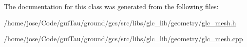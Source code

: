 The documentation for this class was generated from the following files\-:\begin{DoxyCompactItemize}
\item 
/home/jose/\-Code/gui\-Tau/ground/gcs/src/libs/glc\-\_\-lib/geometry/\hyperlink{glc__mesh_8h}{glc\-\_\-mesh.\-h}\item 
/home/jose/\-Code/gui\-Tau/ground/gcs/src/libs/glc\-\_\-lib/geometry/\hyperlink{glc__mesh_8cpp}{glc\-\_\-mesh.\-cpp}\end{DoxyCompactItemize}
